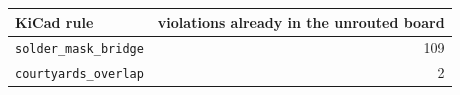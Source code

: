 \begin{tabular}{lr}
\toprule
KiCad rule & violations already in the unrouted board \\
\midrule
\texttt{solder\_mask\_bridge} & 109 \\
\texttt{courtyards\_overlap} & 2 \\
\bottomrule
\end{tabular}
